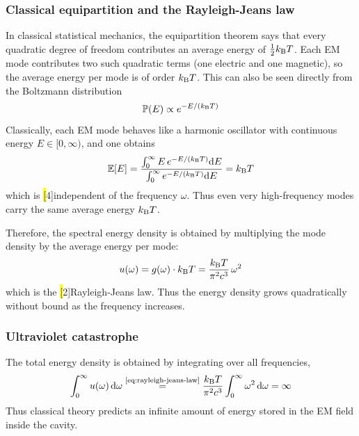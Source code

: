 
\subsubsection{Classical equipartition and the Rayleigh-Jeans law}

In classical statistical mechanics, the equipartition theorem says that every quadratic degree of freedom contributes an average energy of \(\frac12 k_{\mathrm{B}} T\).
Each EM mode contributes two such quadratic terms (one electric and one magnetic), so the average energy per mode is of order
\(
k_{\mathrm{B}} T
\).
This can also be seen directly from the Boltzmann distribution
\[
\operatorname{\mathbb{P}}(E) \propto e^{-E/(k_{\mathrm{B}} T)}
\]
Classically, each EM mode behaves like a harmonic oscillator with continuous energy
\(
E \in [0,\infty)
\),
and one obtains
\[
\operatorname{\mathbb{E}}[E]
=
\frac{\int_0^\infty E\,e^{-E/(k_{\mathrm{B}} T)} \mathrm{d} E}{\int_0^\infty e^{-E/(k_{\mathrm{B}} T)} \mathrm{d} E}
=
k_{\mathrm{B}} T
\]
which is \hl[4]{independent of the frequency \(\omega\)}.
Thus even very high-frequency modes carry the same average energy \(k_{\mathrm{B}} T\).

Therefore, the spectral energy density is obtained by multiplying the mode density by the average energy per mode:
\begin{equation}\label{eq:rayleigh-jeans-law}
  u(\omega)
  =
  g(\omega) \cdot k_{\mathrm{B}} T
=
  \frac{k_{\mathrm{B}} T}{\pi^2 c^3}\,\omega^2
\end{equation}
which is the \hl[2]{Rayleigh-Jeans law}.
Thus the energy density grows quadratically without bound as the frequency increases.

\subsubsection{Ultraviolet catastrophe}

The total energy density is obtained by integrating over all frequencies,
\[
\int_0^\infty u(\omega)\,\mathrm{d}\omega
\overset{\text{\eqref{eq:rayleigh-jeans-law}}}{=}
\frac{k_{\mathrm{B}} T}{\pi^2 c^3}\int_0^\infty \omega^2\,\mathrm{d}\omega
=
\infty
\]
Thus classical theory predicts an infinite amount of energy stored in the EM field inside the cavity.

